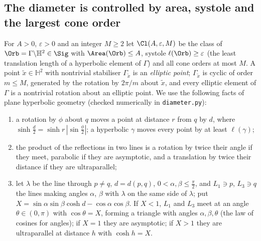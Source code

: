 
\subsection{The diameter is controlled by area, systole and the largest cone order}\label{sec:eig-diam}

For $A>0$, $\varepsilon>0$ and an integer $M\ge2$ let $\Cl(A,\varepsilon,M)$ be the class of $\Orb=\Gamma\backslash\mathbb H^2\in\Sig$ with $\Area(\Orb)\le A$, systole $\ell(\Orb)\ge\varepsilon$ (the least translation length of a hyperbolic element of $\Gamma$) and all cone orders at most $M$. A point $\tilde x\in\mathbb H^2$ with nontrivial stabiliser $\Gamma_{\tilde x}$ is an \emph{elliptic point}; $\Gamma_{\tilde x}$ is cyclic of order $m\le M$, generated by the rotation by $2\pi/m$ about $\tilde x$, and every elliptic element of $\Gamma$ is a nontrivial rotation about an elliptic point. We use the following facts of plane hyperbolic geometry (checked numerically in \texttt{diameter.py}):
\begin{enumerate}[label=(H\arabic*)]
\item a rotation by $\phi$ about $q$ moves a point at distance $r$ from $q$ by $d$, where $\sinh\frac d2=\sinh r\,|\sin\frac\phi2|$; a hyperbolic $\gamma$ moves every point by at least $\ell(\gamma)$;
\item the product of the reflections in two lines is a rotation by twice their angle if they meet, parabolic if they are asymptotic, and a translation by twice their distance if they are ultraparallel;
\item let $\lambda$ be the line through $p\ne q$, $d=d(p,q)$, $0<\alpha,\beta\le\frac\pi2$, and $L_1\ni p$, $L_3\ni q$ the lines making angles $\alpha$, $\beta$ with $\lambda$ on the same side of $\lambda$; put $X=\sin\alpha\sin\beta\cosh d-\cos\alpha\cos\beta$. If $X<1$, $L_1$ and $L_3$ meet at an angle $\theta\in(0,\pi)$ with $\cos\theta=X$, forming a triangle with angles $\alpha,\beta,\theta$ (the law of cosines for angles); if $X=1$ they are asymptotic; if $X>1$ they are ultraparallel at distance $h$ with $\cosh h=X$.
\end{enumerate}

